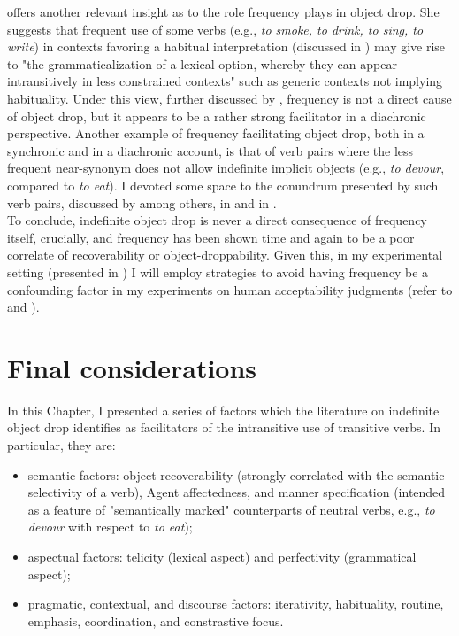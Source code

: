 \textcite{Goldberg2005a} offers another relevant insight as to the role frequency plays in object drop. She suggests that frequent use of some verbs (e.g., \textit{to smoke, to drink, to sing, to write}) in contexts favoring a habitual interpretation (discussed in ) may give rise to "the grammaticalization of a lexical option, whereby they can appear intransitively in less constrained contexts" such as generic contexts not implying habituality. Under this view, further discussed by \textcite[65]{Lorenzetti2008}, frequency is not a direct cause of object drop, but it appears to be a rather strong facilitator in a diachronic perspective. Another example of frequency facilitating object drop, both in a synchronic and in a diachronic account, is that of verb pairs where the less frequent near-synonym does not allow indefinite implicit objects (e.g., \textit{to devour}, compared to \textit{to eat}). I devoted some space to the conundrum presented by such verb pairs, discussed by \textcite{Glass2020, Goldberg2005a, Lorenzetti2008} among others, in  and in .\\
To conclude, indefinite object drop is never a direct consequence of frequency itself, crucially, and frequency has been shown time and again to be a poor correlate of recoverability or object-droppability. Given this, in my experimental setting (presented in ) I will employ strategies to avoid having frequency be a confounding factor in my experiments on human acceptability judgments (refer to  and ).

\section{Final considerations} 
In this Chapter, I presented a series of factors which the literature on indefinite object drop identifies as facilitators of the intransitive use of transitive verbs. In particular, they are:
\begin{itemize}
    \item semantic factors: object recoverability (strongly correlated with the semantic selectivity of a verb), Agent affectedness, and manner specification (intended as a feature of "semantically marked" counterparts of neutral verbs, e.g., \textit{to devour} with respect to \textit{to eat});
    \item aspectual factors: telicity (lexical aspect) and perfectivity (grammatical aspect);
    \item pragmatic, contextual, and discourse factors: iterativity, habituality, routine, emphasis, coordination, and constrastive focus.
\end{itemize}

